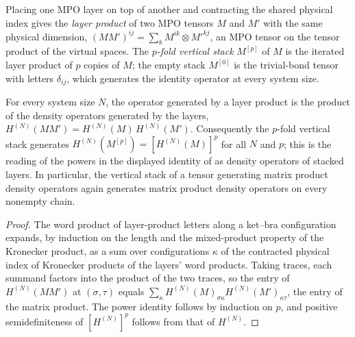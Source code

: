 \begin{definition}
    \label{def:mpo_stacked_layers}
    \leanok
    Placing one MPO layer on top of another and contracting the shared
    physical index gives the \emph{layer product} of two MPO tensors $M$ and
    $M'$ with the same physical dimension,
    $(MM')^{ij}=\sum_kM^{ik}\otimes M'^{kj}$, an MPO tensor on the tensor
    product of the virtual spaces. The \emph{$p$-fold vertical stack}
    $M^{[p]}$ of $M$ is the iterated layer product of $p$ copies of $M$; the
    empty stack $M^{[0]}$ is the trivial-bond tensor with letters
    $\delta_{ij}$, which generates the identity operator at every system
    size.
\end{definition}

\begin{lemma}
    \label{thm:mpo_stacked_layers_power}
    \leanok
    For every system size $N$, the operator generated by a layer
    product is the product of the density operators generated by the layers,
    $H^{(N)}(MM')=H^{(N)}(M)\,H^{(N)}(M')$.
    Consequently the $p$-fold vertical stack generates
    $H^{(N)}(M^{[p]})=[H^{(N)}(M)]^p$ for all $N$ and $p$; this is the
    reading of the powers in the displayed identity of
    \cite[Proposition~4.13, lines~1890--1891]{Cirac2016MPDO_arXiv} as
    density operators of stacked layers. In particular, the vertical stack
    of a tensor generating matrix product density operators again generates
    matrix product density operators on every nonempty chain.
\end{lemma}

\begin{proof}
    \leanok
    The word product of layer-product letters along a ket--bra configuration
    expands, by induction on the length and the mixed-product property of
    the Kronecker product, as a sum over configurations $\kappa$ of the
    contracted physical index of Kronecker products of the layers' word
    products. Taking traces, each summand factors into the product of the
    two traces, so the entry of $H^{(N)}(MM')$ at $(\sigma,\tau)$ equals
    $\sum_\kappa H^{(N)}(M)_{\sigma\kappa}H^{(N)}(M')_{\kappa\tau}$, the
    entry of the matrix product. The power identity follows by induction on
    $p$, and positive semidefiniteness of $[H^{(N)}]^p$ follows from that of
    $H^{(N)}$.
\end{proof}

